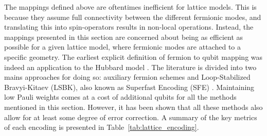 The mappings defined above are oftentimes inefficient for lattice models. This is because they assume full connectivity between the different fermionic modes, and translating this into spin-operators results in non-local operations. Instead, the mappings presented in this section are concerned about being as efficient as possible for a given lattice model, where fermionic modes are attached to a specific geometry. The earliest explicit definition of fermion to qubit mapping was indeed an application to the Hubbard model \cite{Abrams1997}. The literature is divided into two mains approaches for doing so: auxiliary fermion schemes \cite{Verstraete2005, Ball2005} and Loop-Stabilized Bravyi-Kitaev (LSBK), also known as Superfast Encoding (SFE) \cite{Bravyi2002}. Maintaining low Pauli weights comes at a cost of additional qubits for all the methods mentioned in this section. However, it has been shown that all these methods also allow for at least some degree of error correction. A summary of the key metrics of each encoding is presented in Table~\ref{tab:lattice_encoding}.

